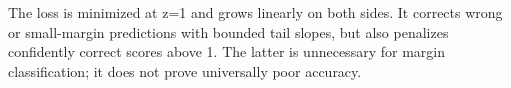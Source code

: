 The loss is minimized at z=1 and grows linearly on both sides. It corrects wrong or small-margin predictions with bounded tail slopes, but also penalizes confidently correct scores above 1. The latter is unnecessary for margin classification; it does not prove universally poor accuracy.
